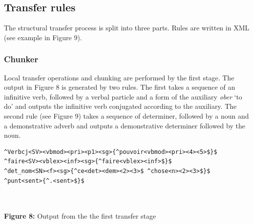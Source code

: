 \documentclass[a0,landscape]{a0poster}
\begin{document}
\begin{multicols}{4}
\subsection{Transfer rules}

\noindent
The structural transfer process is split into three parts. Rules are written in XML (see example in Figure 9).

\subsubsection{Chunker}

\noindent
Local transfer operations and chunking are performed by the first stage. The output in Figure 8 is generated by two rules.  The first takes a sequence of an infinitive verb, followed by a verbal particle and a form of 
the auxiliary \emph{ober} `to do' and outputs the infinitive verb conjugated according 
to the auxiliary. The second rule (see Figure 9) takes a sequence of determiner, followed by a noun and a 
demonstrative adverb and outputs a demonstrative determiner followed by the noun.\\

\begin{center}
\begin{minipage}[b]{26cm}
\begin{small}
\begin{verbatim}
^Verbcj<SV><vbmod><pri><p1><sg>{^pouvoir<vbmod><pri><4><5>$}$ 
^faire<SV><vblex><inf><sg>{^faire<vblex><inf>$}$ 
^det_nom<SN><f><sg>{^ce<det><dem><2><3>$ ^chose<n><2><3>$}$
^punt<sent>{^.<sent>$}$
\end{verbatim}
\end{small}
\end{minipage}\\
~\\
\textbf{Figure 8:} Output from the the first transfer stage
\vspace{0.5cm}
\end{center}
\vspace{0.2cm}


\end{multicols}
\end{document}
